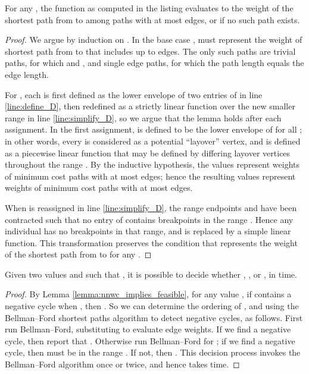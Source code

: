 \documentclass{llncs}
\begin{document}
\begin{lemma}
\label{lemma:lambda_star_correct}
For any , the function  as computed in the listing evaluates to the weight of the shortest path from  to  among paths with at most  edges, or  if no such path exists.
\end{lemma}

\begin{proof}
We argue by induction on .  In the base case ,  must represent the weight of shortest path from  to  that includes up to  edges.  The only such paths are trivial paths, for which  and , and single edge paths, for which the path length equals the edge length.

For , each  is first defined as the lower envelope of two entries of  in line \ref{line:define_D}, then redefined as a strictly linear function over the new smaller range  in line \ref{line:simplify_D}, so we argue that the lemma holds after each assignment.  In the first assignment,  is defined to be the lower envelope of  for all ; in other words, every  is considered as a potential ``layover'' vertex, and  is defined as a piecewise linear function that may be defined by differing layover vertices throughout the range .  By the inductive hypothesis, the  values represent weights of minimum cost paths with at most  edges; hence the resulting  values represent weights of minimum cost paths with at most  edges.

When  is reassigned in line \ref{line:simplify_D}, the range endpoints  and  have been contracted such that no entry of  contains breakpoints in the range .  Hence any individual  has no breakpoints in that range, and is replaced by a simple linear function.  This transformation preserves the condition that  represents the weight of the shortest path from  to  for any .
\end{proof}

\begin{lemma}
\label{lemma:binary_search_decider}
Given two values  and  such that , it is possible to decide whether , , or , in  time.
\end{lemma}

\begin{proof}
By Lemma \ref{lemma:nnwc_implies_feasible}, for any value , if  contains a negative cycle when , then .  So we can determine the ordering of , and  using the Bellman--Ford shortest paths algorithm \cite{bellman1958,ford1962} to detect negative cycles, as follows.  First run Bellman--Ford, substituting  to evaluate edge weights.  If we find a negative cycle, then report that .  Otherwise run Bellman--Ford for ; if we find a negative cycle, then  must be in the range .  If not, then .  This decision process invokes the Bellman--Ford algorithm once or twice, and hence takes  time.
\end{proof}
\end{document}
